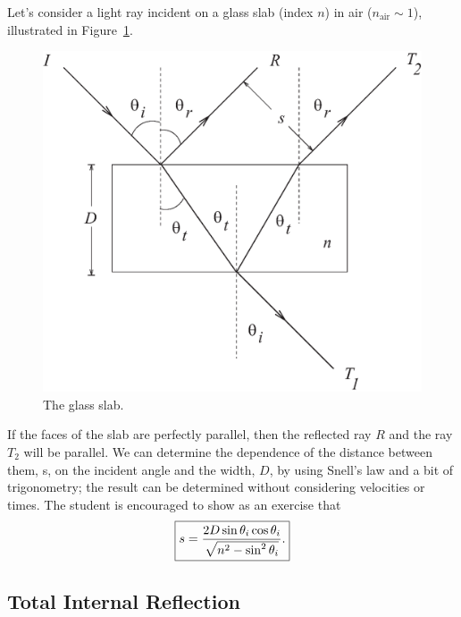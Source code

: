 Let's consider a light ray incident on a glass slab (index $n$) in air 
($n_{\mbox{air}}\sim 1$), illustrated in Figure~\ref{fig:opt:slab}.
\begin{figure}[htb]
\centering 
\epsfxsize=10cm \includegraphics[scale=0.6]{8_optics/slab.eps}
\caption{The glass slab.}
\label{fig:opt:slab}
\end{figure}
If the faces of the slab are perfectly parallel, then the reflected ray $R$ 
and the ray $T_2$ will be parallel. We can determine the dependence of the 
distance between them, s, on the incident angle and the width, $D$, by 
using Snell's law and a bit of trigonometry;  the result can be determined 
without considering velocities or times. The student is encouraged to show as 
an exercise that
\begin{equation}
\fbox{$ \displaystyle s =\frac{2D\sin\theta_i\cos\theta_i}{\sqrt{n^2-\sin^2\theta_i}}. $}
\label{eq:opt:slab}
\end{equation}

\subsection{Total Internal Reflection}
\label{sec:opt:totintref}

